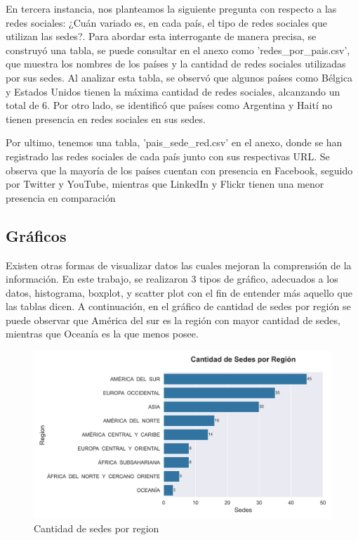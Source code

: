 \documentclass[10pt,a4paper]{article}
\begin{document}
\vspace{12pt}

En tercera instancia, nos planteamos la siguiente pregunta con respecto a las redes sociales: ¿Cuán variado es, en cada país, el tipo de redes sociales que utilizan las sedes?. Para abordar esta interrogante de manera precisa, se construyó una tabla, se puede consultar en el anexo como 'redes\_por\_pais.csv', que muestra los nombres de los países y la cantidad de redes sociales utilizadas por sus sedes. Al analizar esta tabla, se observó que algunos países como Bélgica y Estados Unidos tienen la máxima cantidad de redes sociales, alcanzando un total de 6. Por otro lado, se identificó que países como Argentina y Haití no tienen presencia en redes sociales en sus sedes.

\vspace{0.1cm}

Por ultimo, tenemos una tabla, 'pais\_sede\_red.csv' en el anexo, donde se han registrado las redes sociales de cada país junto con sus respectivas URL. Se observa que la mayoría de los países cuentan con presencia en Facebook, seguido por Twitter y YouTube, mientras que LinkedIn y Flickr tienen una menor presencia en comparación


\subsection{Gráficos} \vspace{0.3cm}

Existen otras formas de visualizar datos las cuales mejoran la comprensión de la información. En este trabajo, se realizaron 3 tipos de gráfico, adecuados a los datos, histograma, boxplot, y scatter plot con el fin de entender más aquello que las tablas dicen.
A continuación, en el gráfico de cantidad de sedes por región se puede observar que América del sur es la región con mayor cantidad de sedes, mientras que Oceanía es la que menos posee.

\vspace{12pt}

\begin{figure}[h]
  \centering
  \includegraphics[width=1\textwidth]{bar_region.png}
  \caption{ Cantidad de sedes por region}
  \label{fig:Tabla 2}
\end{figure}
\end{document}
